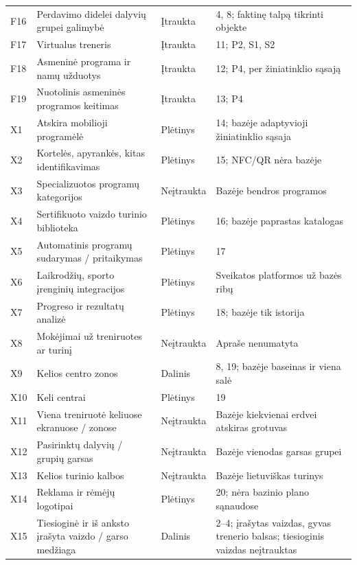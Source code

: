 \begin{longtable}{@{}p{1.15cm}p{6.15cm}p{2.75cm}p{4cm}@{}}
F16 & Perdavimo didelei dalyvių grupei galimybė & Įtraukta & 4, 8; faktinę talpą tikrinti objekte \\
F17 & Virtualus treneris & Įtraukta & 11; P2, S1, S2 \\
F18 & Asmeninė programa ir namų užduotys & Įtraukta & 12; P4, per žiniatinklio sąsają \\
F19 & Nuotolinis asmeninės programos keitimas & Įtraukta & 13; P4 \\
\midrule
X1 & Atskira mobilioji programėlė & Plėtinys & 14; bazėje adaptyvioji žiniatinklio sąsaja \\
X2 & Kortelės, apyrankės, kitas identifikavimas & Plėtinys & 15; NFC/QR nėra bazėje \\
X3 & Specializuotos programų kategorijos & Neįtraukta & Bazėje bendros programos \\
X4 & Sertifikuoto vaizdo turinio biblioteka & Plėtinys & 16; bazėje paprastas katalogas \\
X5 & Automatinis programų sudarymas / pritaikymas & Plėtinys & 17 \\
X6 & Laikrodžių, sporto įrenginių integracijos & Plėtinys & Sveikatos platformos už bazės ribų \\
X7 & Progreso ir rezultatų analizė & Plėtinys & 18; bazėje tik istorija \\
X8 & Mokėjimai už treniruotes ar turinį & Neįtraukta & Apraše nenumatyta \\
X9 & Kelios centro zonos & Dalinis & 8, 19; bazėje baseinas ir viena salė \\
X10 & Keli centrai & Plėtinys & 19 \\
X11 & Viena treniruotė keliuose ekranuose / zonose & Neįtraukta & Bazėje kiekvienai erdvei atskiras grotuvas \\
X12 & Pasirinktų dalyvių / grupių garsas & Neįtraukta & Bazėje vienodas garsas grupei \\
X13 & Kelios turinio kalbos & Neįtraukta & Bazėje lietuviškas turinys \\
X14 & Reklama ir rėmėjų logotipai & Plėtinys & 20; nėra bazinio plano sąnaudose \\
X15 & Tiesioginė ir iš anksto įrašyta vaizdo / garso medžiaga & Dalinis & 2--4; įrašytas vaizdas, gyvas trenerio balsas; tiesioginis vaizdas neįtrauktas \\
\bottomrule
\end{longtable}
\normalsize
